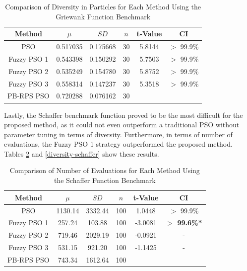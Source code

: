 \begin{table}[!t]
  \renewcommand{\arraystretch}{1.3}
  \caption{Comparison of Diversity in Particles for Each Method Using the Griewank Function Benchmark}
  \label{diversity-griewank}
  \centering
  \begin{tabular}{|c|c|c|c|c|c|}
    \hline
    Method & $\mu$ & $SD$ & $n$ & t-Value & CI \\
    \hline
    PSO 		& 0.517035 & 0.175668 & 30 & 5.8144 & $>$ 99.9\% \\
    \hline
    Fuzzy PSO 1 & 0.543398 & 0.150292 & 30 & 5.7503 & $>$ 99.9\% \\
    \hline
    Fuzzy PSO 2 & 0.535249 & 0.154780 & 30 & 5.8752 & $>$ 99.9\% \\
    \hline
    Fuzzy PSO 3 & 0.558314 & 0.147237 & 30 & 5.3518 & $>$ 99.9\% \\
    \hline
    PB-RPS PSO  & 0.720288 & 0.076162 & 30 &  &  \\
    \hline
  \end{tabular}
\end{table}

Lastly, the Schaffer benchmark function proved to be the most difficult for the proposed method, as it could not even outperform a traditional PSO without parameter tuning in terms of diversity. Furthermore, in terms of number of evaluations, the Fuzzy PSO 1 strategy outperformed the proposed method. Tables \ref{evaluations-schaffer} and \ref{diversity-schaffer} show these results.

\begin{table}[!t]
  \renewcommand{\arraystretch}{1.3}
  \caption{Comparison of Number of Evaluations for Each Method Using the Schaffer Function Benchmark}
  \label{evaluations-schaffer}
  \centering
  \begin{tabular}{|c|c|c|c|c|c|}
    \hline
    Method & $\mu$ & $SD$ & $n$ & t-Value & CI \\
    \hline
    PSO 		& 1130.14 & 3332.44 & 100 & 1.0448 & $>$ 99.9\% \\
    \hline
    Fuzzy PSO 1 & 257.24 & 103.88 & 100 & -3.0081 & \textbf{$>$ 99.6\%*} \\
    \hline
    Fuzzy PSO 2 & 719.46 & 2029.19 & 100 & -0.0921 & - \\
    \hline
    Fuzzy PSO 3 & 531.15 & 921.20 & 100 & -1.1425 & - \\
    \hline
    PB-RPS PSO  & 743.34 & 1612.64 & 100 &  &  \\
    \hline
  \end{tabular}
\end{table}

